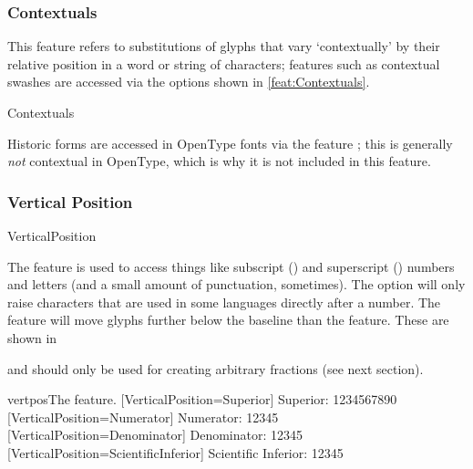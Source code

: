 \subsubsection{Contextuals}
This feature refers to substitutions of glyphs that vary `contextually' by their relative position in a word or string of characters;
features such as contextual swashes are accessed via the options shown in \ref{feat:Contextuals}.

\begin{features}{Contextuals}
\end{features}

Historic forms are accessed in OpenType
fonts via the feature ; this is generally \emph{not}
contextual in OpenType, which is why it is not included in this feature.

\subsubsection{Vertical Position}

\begin{features}{VerticalPosition}
\end{features}

The  feature is used to access things like
subscript () and superscript () numbers and
letters (and a small amount of punctuation, sometimes).
The  option will only raise characters that are used
in some languages directly after a number.
The  feature will move glyphs
further below the baseline than the  feature.
These are shown in 

 and  should only be used for creating
arbitrary fractions (see next section).

\begin{Lexample}{vertpos}{The  feature.}
  [VerticalPosition=Superior]
   Superior: 1234567890                                   \\
  [VerticalPosition=Numerator]
   Numerator: 12345                                       \\
  [VerticalPosition=Denominator]
   Denominator: 12345                                     \\
  [VerticalPosition=ScientificInferior]
   Scientific Inferior: 12345
\end{Lexample}

